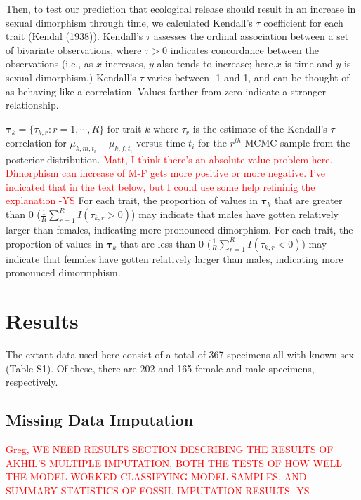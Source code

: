 \documentclass[
  12pt,
]{article}
\begin{document}
Then, to test our prediction that ecological release should result in an
increase in sexual dimorphism through time, we calculated Kendall's
\(\tau\) coefficient for each trait (Kendal
(\protect\hyperlink{ref-KendallsTau}{1938})). Kendall's \(\tau\)
assesses the ordinal association between a set of bivariate
observations, where \(\tau > 0\) indicates concordance between the
observations (i.e., as \(x\) increases, \(y\) also tends to increase;
here,\(x\) is time and \(y\) is sexual dimorphism.) Kendall's \(\tau\)
varies between -1 and 1, and can be thought of as behaving like a
correlation. Values farther from zero indicate a stronger relationship.

\(\boldsymbol{\tau}_k = \{\tau_{k,r}: r = 1,\cdots,R\}\) for trait \(k\)
where \(\tau_r\) is the estimate of the Kendall's \(\tau\) correlation
for \(\mu_{k,m,t_i} - \mu_{k,f,t_i}\) versus time \(t_i\) for the
\(r^{th}\) MCMC sample from the posterior distribution.
\textcolor{red}{Matt, I think there's an absolute value problem here. Dimorphism can increase of M-F gets more positive or more negative. I've indicated that in the text below, but I could use some help refininig the explanation -YS}
For each trait, the proportion of values in \(\boldsymbol{\tau}_k\) that
are greater than 0 (\(\frac{1}{R} \sum_{r=1}^R I(\tau_{k,r} > 0)\)) may
indicate that males have gotten relatively larger than females,
indicating more pronounced dimorphism. For each trait, the proportion of
values in \(\boldsymbol{\tau}_k\) that are less than 0
(\(\frac{1}{R} \sum_{r=1}^R I(\tau_{k,r} < 0)\)) may indicate that
females have gotten relatively larger than males, indicating more
pronounced dimormphism.

\hypertarget{sec:results}{%
\section{Results}\label{sec:results}}

The extant data used here consist of a total of 367 specimens all with
known sex (Table S1). Of these, there are 202 and 165 female and male
specimens, respectively.

\hypertarget{missing-data-imputation}{%
\subsection{Missing Data Imputation}\label{missing-data-imputation}}

\textcolor{red}{Greg, WE NEED RESULTS SECTION DESCRIBING THE RESULTS OF AKHIL'S MULTIPLE IMPUTATION, BOTH THE TESTS OF HOW WELL THE MODEL WORKED CLASSIFYING MODEL SAMPLES, AND SUMMARY STATISTICS OF FOSSIL IMPUTATION RESULTS -YS}
\end{document}
